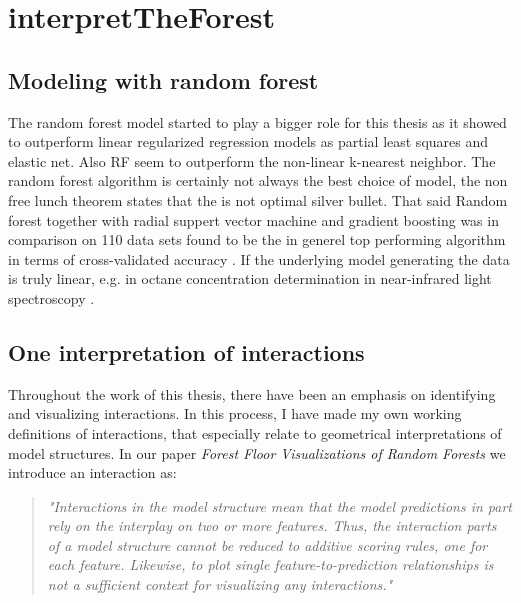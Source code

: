 \chapter{interpretTheForest}

\section{Modeling with random forest}
The random forest model started to play a bigger role for this thesis as it showed to outperform linear regularized regression models as partial least squares and elastic net. Also RF seem to outperform the non-linear k-nearest neighbor. The random forest algorithm is certainly not always the best choice of model, the non free lunch theorem states that the is not optimal silver bullet. That said Random forest together with radial suppert vector machine and gradient boosting was in comparison on 110 data sets found to be the in generel top performing algorithm in terms of cross-validated accuracy \cite{wainer2016comparison}. If the underlying model generating the data is truly linear, e.g. in octane concentration determination in near-infrared light spectroscopy \cite{kalivas1997two}.


\section{One interpretation of interactions}
\label{defineInteractions}
Throughout the work of this thesis, there have been an emphasis on identifying and visualizing interactions. In this process, I have made my own working definitions of interactions, that especially relate to geometrical interpretations of model structures. In our paper \textit{Forest Floor Visualizations of Random Forests} we introduce an interaction as:

\begin{quotation}
\textit{
"Interactions in the model structure mean that the model predictions in part rely on the interplay on two or more features. Thus, the interaction parts of a model structure cannot be reduced to additive scoring rules, one for each feature. Likewise, to plot single feature-to-prediction relationships is not a sufficient context for visualizing any interactions."
}
\cite{welling2016forest}
\end{quotation}

